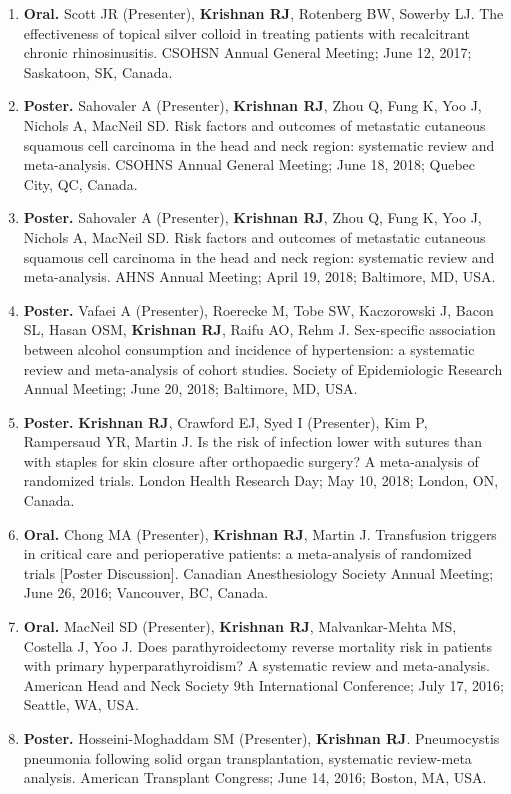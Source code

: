 \documentclass[10.5pt,letterpaper]{article}
\newcommand{\myname}{\textbf{Krishnan RJ}}
\begin{document}
\begin{enumerate}
\item \textbf{Oral.} Scott JR (Presenter), \myname, Rotenberg BW, Sowerby LJ. The effectiveness of topical silver colloid in treating patients with recalcitrant chronic rhinosinusitis. CSOHSN Annual General Meeting; June 12, 2017; Saskatoon, SK, Canada.
\item \textbf{Poster.} Sahovaler A (Presenter), \myname, Zhou Q, Fung K, Yoo J, Nichols A, MacNeil SD. Risk factors and outcomes of metastatic cutaneous squamous cell carcinoma in the head and neck region: systematic review and meta-analysis. CSOHNS Annual General Meeting; June 18, 2018; Quebec City, QC, Canada.
\item \textbf{Poster.} Sahovaler A (Presenter), \myname, Zhou Q, Fung K, Yoo J, Nichols A, MacNeil SD. Risk factors and outcomes of metastatic cutaneous squamous cell carcinoma in the head and neck region: systematic review and meta-analysis. AHNS Annual Meeting; April 19, 2018; Baltimore, MD, USA.
\item \textbf{Poster.} Vafaei A (Presenter), Roerecke M, Tobe SW, Kaczorowski J, Bacon SL, Hasan OSM, \myname, Raifu AO, Rehm J. Sex-specific association between alcohol consumption and incidence of hypertension: a systematic review and meta-analysis of cohort studies. Society of Epidemiologic Research Annual Meeting; June 20, 2018; Baltimore, MD, USA.
\item \textbf{Poster.} \myname, Crawford EJ, Syed I (Presenter), Kim P, Rampersaud YR, Martin J. Is the risk of infection lower with sutures than with staples for skin closure after orthopaedic surgery? A meta-analysis of randomized trials. London Health Research Day; May 10, 2018; London, ON, Canada.
\item \textbf{Oral.} Chong MA (Presenter), \myname, Martin J. Transfusion triggers in critical care and perioperative patients: a meta-analysis of randomized trials [Poster Discussion]. Canadian Anesthesiology Society Annual Meeting; June 26, 2016; Vancouver, BC, Canada.
\item \textbf{Oral.} MacNeil SD (Presenter), \myname, Malvankar-Mehta MS, Costella J, Yoo J. Does parathyroidectomy reverse mortality risk in patients with primary hyperparathyroidism? A systematic review and meta-analysis. American Head and Neck Society 9th International Conference; July 17, 2016; Seattle, WA, USA.
\item \textbf{Poster.} Hosseini-Moghaddam SM (Presenter), \myname. Pneumocystis pneumonia following solid organ transplantation, systematic review-meta analysis. American Transplant Congress; June 14, 2016; Boston, MA, USA.

\end{enumerate}
\end{document}
